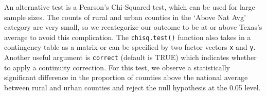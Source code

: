 \documentclass[
  letterpaper,
]{krantz}
\makeatletter
\newenvironment{Shaded}{\begin{snugshade}}{\end{snugshade}}
\newcommand{\CommentTok}[1]{\textcolor[rgb]{0.37,0.37,0.37}{#1}}
\newcommand{\FunctionTok}[1]{\textcolor[rgb]{0.28,0.35,0.67}{#1}}
\newcommand{\NormalTok}[1]{\textcolor[rgb]{0.00,0.23,0.31}{#1}}
\newcommand{\OtherTok}[1]{\textcolor[rgb]{0.00,0.23,0.31}{#1}}
\newcommand{\SpecialCharTok}[1]{\textcolor[rgb]{0.37,0.37,0.37}{#1}}
\newcommand{\StringTok}[1]{\textcolor[rgb]{0.13,0.47,0.30}{#1}}
\newenvironment{kframe}{%
\medskip{}
\setlength{\fboxsep}{.8em}
 \def\at@end@of@kframe{}%
 \ifinner\ifhmode%
  \def\at@end@of@kframe{\end{minipage}}%
  \begin{minipage}{\columnwidth}%
 \fi\fi%
 \def\FrameCommand##1{\hskip\@totalleftmargin \hskip-\fboxsep
 \colorbox{shadecolor}{##1}\hskip-\fboxsep
     \hskip-\linewidth \hskip-\@totalleftmargin \hskip\columnwidth}%
 \MakeFramed {\advance\hsize-\width
   \@totalleftmargin\z@ \linewidth\hsize
   \@setminipage}}%
 {\par\unskip\endMakeFramed%
 \at@end@of@kframe}
\renewenvironment{Shaded}{\begin{kframe}}{\end{kframe}}
\makeatother
\begin{document}
An alternative test is a Pearson's Chi-Squared test, which can be used
for large sample sizes. The counts of rural and urban counties in the
`Above Nat Avg' category are very small, so we recategorize our outcome
to be at or above Texas's average to avoid this complication. The
\texttt{chisq.test()} function also takes in a contingency table as a
matrix or can be specified by two factor vectors \texttt{x} and
\texttt{y}. Another useful argument is \texttt{correct} (default is
TRUE) which indicates whether to apply a continuity correction. For this
test, we observe a statistically significant difference in the
proportion of counties above the national average between rural and
urban counties and reject the null hypothesis at the 0.05 level.

\begin{Shaded}
\end{Shaded}

\begin{Shaded}
\end{Shaded}
\end{document}
